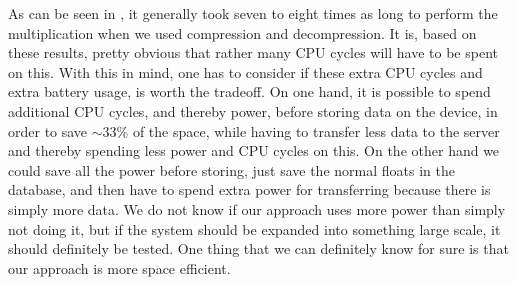 \begin{table}[!htbp]
\centering
    \caption{Results of compression test}
    \label{tab:results_of_compression_test}
\end{table}
\FloatBarrier

As can be seen in , it generally took seven to eight times as long to perform the multiplication when we used compression and decompression. It is, based on these results, pretty obvious that rather many CPU cycles will have to be spent on this. With this in mind, one has to consider if these extra CPU cycles and extra battery usage, is worth the tradeoff. On one hand, it is possible to spend additional CPU cycles, and thereby power, before storing data on the device, in order to save $\sim 33\%$ of the space, while having to transfer less data to the server and thereby spending less power and CPU cycles on this. On the other hand we could save all the power before storing, just save the normal floats in the database, and then have to spend extra power for transferring because there is simply more data. We do not know if our approach uses more power than simply not doing it, but if the system should be expanded into something large scale, it should definitely be tested. One thing that we can definitely know for sure is that our approach is more space efficient. 

